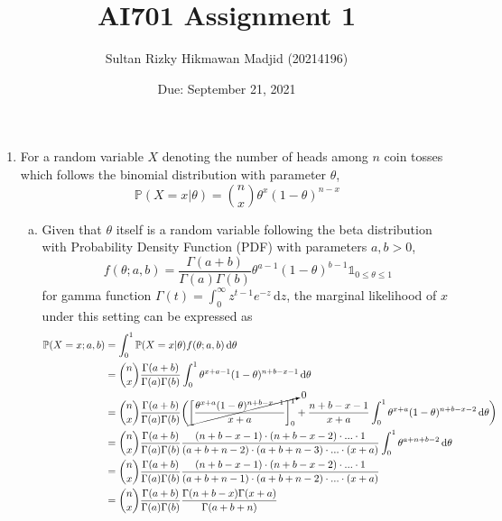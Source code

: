 \documentclass[a4paper,10pt]{article}
\title{AI701 Assignment 1}
\author{Sultan Rizky Hikmawan Madjid (20214196)}
\date{Due: September 21, 2021}
\begin{document}
	
\maketitle

\begin{enumerate}
\item For a random variable $X$ denoting the number of heads among $n$ coin tosses which follows the binomial distribution with parameter $\theta$,
\begin{equation*}
	\mathbb{P}(X=x|\theta) = \binom{n}{x} \theta^x (1-\theta)^{n-x}
\end{equation*}
\begin{enumerate}[(a)]
	\item Given that $\theta$ itself is a random variable following the beta distribution with Probability Density Function (PDF) with parameters $a,b > 0$,
	\begin{equation*}
		f(\theta;a,b) = \frac{\Gamma(a+b)}{\Gamma(a)\Gamma(b)} \theta^{a-1} (1-\theta)^{b-1}\mathds{1}_{0 \leq \theta \leq 1}
	\end{equation*}
	for gamma function $\Gamma(t) = \int_{0}^{\infty} z^{t-1}e^{-z} \,\mathrm{d}z$, the marginal likelihood of $x$ under this setting can be expressed as
	\begin{equation*}
		\begin{aligned}
			\mathbb{P}(X = x;a,b) &= \int_{0}^{1} \mathbb{P}(X=x|\theta) f(\theta;a,b) \,\mathrm{d}\theta \\
			&= \binom{n}{x} \frac{\Gamma(a+b)}{\Gamma(a)\Gamma(b)} \int_{0}^{1} \theta^{x+a-1} (1-\theta)^{n+b-x-1} \,\mathrm{d}\theta \\
			&= \binom{n}{x} \frac{\Gamma(a+b)}{\Gamma(a)\Gamma(b)} \biggl(\cancelto{0}{\biggl[\frac{\theta^{x+a} (1-\theta)^{n+b-x-1}}{x+a}\biggr]_0^1} + \frac{n+b-x-1}{x+a} \int_{0}^{1} \theta^{x+a} (1-\theta)^{n+b-x-2} \,\mathrm{d}\theta\biggr) \\
			&= \binom{n}{x} \frac{\Gamma(a+b)}{\Gamma(a)\Gamma(b)} \frac{(n+b-x-1) \cdot (n+b-x-2) \cdot ... \cdot 1}{(a+b+n-2) \cdot (a+b+n-3) \cdot ... \cdot (x+a)} \int_{0}^{1} \theta^{a+n+b-2} \,\mathrm{d}\theta \\
			&= \binom{n}{x} \frac{\Gamma(a+b)}{\Gamma(a)\Gamma(b)} \frac{(n+b-x-1) \cdot (n+b-x-2) \cdot ... \cdot 1}{(a+b+n-1) \cdot (a+b+n-2) \cdot ... \cdot (x+a)} \\
			&= \binom{n}{x} \frac{\Gamma(a+b)}{\Gamma(a)\Gamma(b)} \frac{\Gamma(n+b-x)\Gamma(x+a)}{\Gamma(a+b+n)}
		\end{aligned}

\end{equation*}
\end{enumerate}
\end{enumerate}
\end{document}
